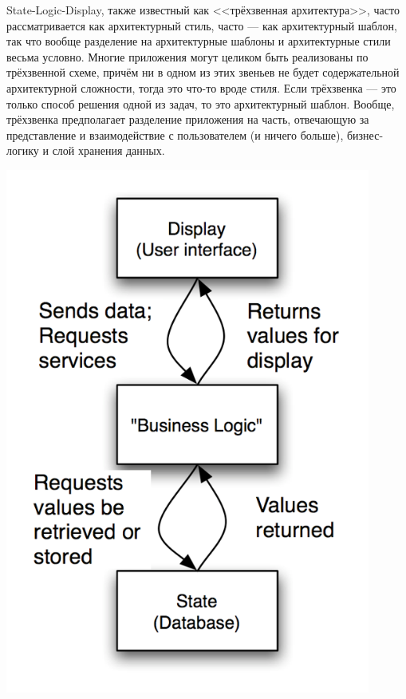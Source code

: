 \documentclass{../../text-style}
\begin{document}
\noindent\begin{minipage}{\textwidth}
    \begin{minipage}[c][6cm][c]{\dimexpr0.7\textwidth-0.5\Colsep\relax}
        State-Logic-Display, также известный как <<трёхзвенная архитектура>>, часто рассматривается как архитектурный стиль, часто --- как архитектурный шаблон, так что вообще разделение на архитектурные шаблоны и архитектурные стили весьма условно. Многие приложения могут целиком быть реализованы по трёхзвенной схеме, причём ни в одном из этих звеньев не будет содержательной архитектурной сложности, тогда это что-то вроде стиля. Если трёхзвенка --- это только способ решения одной из задач, то это архитектурный шаблон. Вообще, трёхзвенка предполагает разделение приложения на часть, отвечающую за представление и взаимодействие с пользователем (и ничего больше), бизнес-логику и слой хранения данных.
    \end{minipage}\hfill
    \begin{minipage}[c][6cm][c]{\dimexpr0.3\textwidth-0.5\Colsep\relax}
        \includegraphics[width=0.9\textwidth]{threeTieredArchitecture.png}
    \end{minipage}%
\end{minipage}
\end{document}
